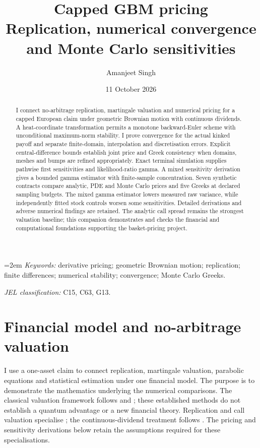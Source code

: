 \documentclass[11pt]{article}
\title{Capped GBM pricing\\[2mm]\large Replication, numerical convergence and Monte Carlo sensitivities}
\author{Amanjeet Singh}
\date{11 October 2026}
\begin{document}
\maketitle
\begin{abstract}
I connect no-arbitrage replication, martingale valuation and numerical
pricing for a capped European claim under geometric Brownian motion with
continuous dividends. A heat-coordinate transformation permits a monotone
backward-Euler scheme with unconditional maximum-norm stability. I prove
convergence for the actual kinked payoff and separate finite-domain,
interpolation and discretisation errors. Explicit central-difference bounds
establish joint price and Greek consistency when domains, meshes and bumps
are refined appropriately. Exact terminal simulation supplies pathwise
first sensitivities and likelihood-ratio gamma. A mixed sensitivity
derivation gives a bounded gamma estimator with finite-sample concentration.
Seven synthetic contracts compare analytic, PDE and Monte Carlo prices and
five Greeks at declared sampling budgets. The mixed gamma estimator lowers
measured raw variance, while independently fitted stock controls worsen
some sensitivities. Detailed derivations and adverse numerical findings are
retained. The analytic call spread remains the strongest valuation baseline;
this companion demonstrates and checks the financial and computational
foundations supporting the basket-pricing project.
\end{abstract}
\noindent\begin{minipage}{\linewidth}
\small\emergencystretch=2em
\textit{Keywords:} derivative pricing; geometric Brownian motion; replication;
finite differences; numerical stability; convergence; Monte Carlo Greeks.\par
\smallskip\textit{JEL classification:} C15, C63, G13.\par
\end{minipage}

\section{Financial model and no-arbitrage valuation}
\label{sec:cgbm-model}

I use a one-asset claim to connect replication, martingale valuation,
parabolic equations and statistical estimation under one financial model.
The purpose is to demonstrate the mathematics underlying the numerical
comparisons. The classical valuation framework follows
\citet{blackscholes1973} and \citet{merton1973}; these established methods
do not establish a quantum advantage or a new financial theory. Replication and call valuation specialise
\citet{blackscholes1973}; the continuous-dividend treatment follows
\citet{merton1973}. The pricing and sensitivity derivations below retain
the assumptions required for these specialisations.
\end{document}
